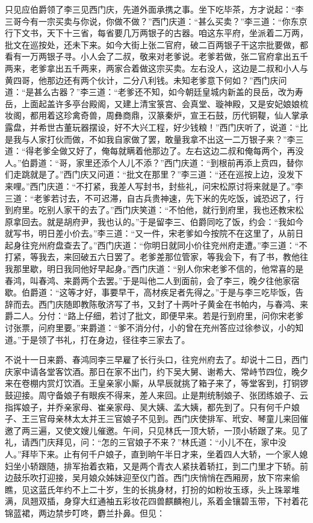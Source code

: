 只见应伯爵领了李三见西门庆，先道外面承携之事。坐下吃毕茶，方才说起：“李三哥今有一宗买卖与你说，你做不做？”西门庆道：“甚么买卖？”李三道：“你东京行下文书，天下十三省，每省要几万两银子的古器。咱这东平府，坐派着二万两，批文在巡按处，还未下来。如今大街上张二官府，破二百两银子干这宗批要做，都看有一万两银子寻。小人会了二叔，敬来对老爹说。老爹若做，张二官府拿出五千两来，老爹拿出五千两来，两家合着做这宗买卖。左右没人，这边是二叔和小人与黄四哥，他那边还有两个伙计，二分八利钱。未知老爹意下何如？”西门庆问道：“是甚么古器？”李三道：“老爹还不知，如今朝廷皇城内新盖的艮岳，改为寿岳，上面起盖许多亭台殿阁，又建上清宝箓宫、会真堂、璇神殿，又是安妃娘娘梳妆阁，都用着这珍禽奇兽，周彝商鼎，汉篆秦炉，宣王石鼓，历代铜鞮，仙人掌承露盘，并希世古董玩器摆设，好不大兴工程，好少钱粮！”西门庆听了，说道：“比是我与人家打伙而做，不如我自家做了罢，敢量我拿不出这一二万银子来？”李三道：“得老爹全做又好了，俺每就瞒着他那边了。左右这边二叔和俺每两个，再没人。”伯爵道：“哥，家里还添个人儿不添？”西门庆道：“到根前再添上贲四，替你们走跳就是了。”西门庆又问道：“批文在那里？”李三道：“还在巡按上边，没发下来哩。”西门庆道：“不打紧，我差人写封书，封些礼，问宋松原讨将来就是了。”李三道：“老爹若讨去，不可迟滞，自古兵贵神速，先下米的先吃饭，诚恐迟了，行到府里。吃别人家干的去了。”西门庆笑道：“不怕他，就行到府里，我也还教宋松原拿回去。就是胡府尹，我也认的。”于是留李三、伯爵同吃了饭，约会：“我如今就写书，明日差小价去。”李三道：“又一件，宋老爹如今按院不在这里了，从前日起身往兖州府盘查去了。”西门庆道：“你明日就同小价往兖州府走遭。”李三道：“不打紧，等我去，来回破五六日罢了。老爹差那位管家，等我会下，有了书，教他往我那里歇，明日我同他好早起身。”西门庆道：“别人你宋老爹不信的，他常喜的是春鸿，叫春鸿、来爵两个去罢。”于是叫他二人到面前，会了李三，晚夕往他家宿歇。伯爵道：“这等才好，事要早干，高材疾足者先得之。”于是与李三吃毕饭，告辞而去。西门庆随即教陈敬济写了书，又封了十两叶子黄金在书帕内，与春鸿、来爵二人。分付：“路上仔细，若讨了批文，即便早来。若是行到府里，问你宋老爹讨张票，问府里要。”来爵道：“爹不消分付，小的曾在充州答应过徐参议，小的知道。”于是领了书礼，打在身边，径往李三家去了。

不说十一日来爵、春鸿同李三早雇了长行头口，往兖州府去了。却说十二日，西门庆家中请各堂客饮酒。那日在家不出门，约下吴大舅、谢希大、常峙节四位，晚夕来在卷棚内赏灯饮酒。王皇亲家小厮，从早辰就挑了箱子来了，等堂客到，打铜锣鼓迎接。周守备娘子有眼疾不得来，差人来回。止是荆统制娘子、张团练娘子、云指挥娘子，并乔亲家母、崔亲家母、吴大姨、孟大姨，都先到了。只有何千户娘子、王三官母亲林太太并王三官娘子不见到。西门庆使排军、玳安、琴童儿来回催邀了两三遍，又使文嫂儿催邀。午间，只见林氏一顶大轿，一顶小轿跟了来。见了礼，请西门庆拜见，问：“怎的三官娘子不来？”林氏道：“小儿不在，家中没人。”拜毕下来。止有何千户娘子，直到晌午半日才来，坐着四人大轿，一个家人媳妇坐小轿跟随，排军抬着衣箱，又是两个青衣人紧扶着轿扛，到二门里才下轿。前边鼓乐吹打迎接，吴月娘众姊妹迎至仪门首。西门庆悄悄在西厢房，放下帘来偷瞧，见这蓝氏年约不上二十岁，生的长挑身材，打扮的如粉妆玉琢，头上珠翠堆满，凤翘双插，身穿大红通袖五彩妆花四兽麒麟袍儿，系着金镶碧玉带，下衬着花锦蓝裙，两边禁步叮咚，麝兰扑鼻。但见：

